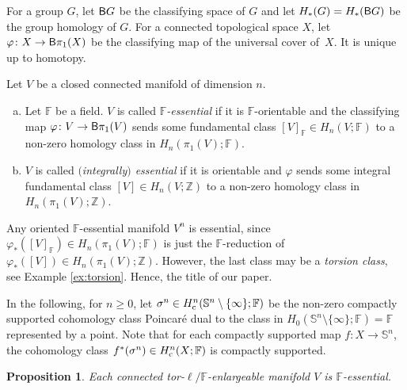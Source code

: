 \documentclass[10pt,a4paper]{amsart}
\numberwithin{equation}{section}
\newtheorem{Proposition}[Theorem]{Proposition}
\newcommand{\F}{\mathbb{F}}
\newcommand{\Z}{\mathbb{Z}}
\newcommand{\SSS}{\mathbb{S}}
\begin{document}
For a group $G$, let ${\sf B}G$ be the classifying space of $G$ and let $H_*(G) = H_*({\sf B}G)$ be the group homology of $G$.
For a connected topological space $X$, let
$\varphi \colon  X \to {\sf B} \pi_1(X)$
be the classifying map of the universal cover of~$X$.
It is unique up to homotopy.

\begin{Definition} \label{def:essential} Let $V$ be a closed connected manifold of dimension $n$.
\begin{enumerate}[(a)]\itemsep=0pt
\item Let $\F$ be a field.
$V$ is called {\em $\F$-essential} if it is $\F$-orientable and the classifying map $\varphi \colon V \to {\sf B}\pi_1(V)$ sends some fundamental class $[V] _\F \in H_{n}(V; \F)$ to a non-zero homology class in $H_n(\pi_1(V); \F)$.
\item $V$ is called {\em $($integrally$)$ essential} if it is orientable and $\varphi$ sends some integral fundamental class $[V] \in H_n(V;\Z)$ to a non-zero homology class in $H_n(\pi_1(V); \Z)$.
\end{enumerate}
\end{Definition}

Any oriented $\F$-essential manifold $V^n$ is essential, since $\varphi_*([V]_\F) \in H_n( \pi_1(V) ; \F)$ is just the $\F$-reduction of $\varphi_*([V]) \in H_n(\pi_1(V) ; \Z)$.
However, the last class may be a {\em torsion class}, see Example \ref{ex:torsion}.
Hence, the title of our paper.

In the following, for $n \geq 0$, let $\sigma^n \in H^{n}_{\rm c}(\SSS^{n} \setminus \{ \infty\}; \F)$ be the non-zero compactly supported cohomology class Poincar\'e dual to the class in $H_0( \SSS^{n} \setminus \{ \infty\}; \F) = \F$ represented by a point.
Note that for each compactly supported map $f \colon X \to \SSS^{n}$, the cohomology class $f^*(\sigma^n) \in H^{n}_{\rm c}(X; \F)$ is compactly supported.

\begin{Proposition} \label{special} Each connected tor-$\ell / \F$-enlargeable manifold $V$ is $\F$-essential.
\end{Proposition}
\end{document}

